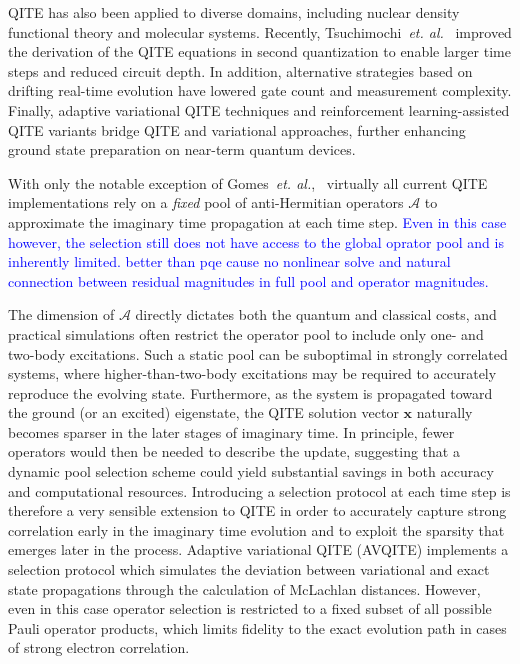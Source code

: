 \documentclass[aip,jcp,amsmath,amssymb, reprint]{revtex4-1}
\newcommand{\note}[2]{%
  \ifthenelse{\boolean{shownotes}}%
    {\textcolor{#1}{#2}}%
    {}%
}
\begin{document}
QITE has also been applied to diverse domains, including nuclear density functional theory\cite{li2024quantum} and molecular systems. Recently, Tsuchimochi~\textit{et. al.}~\cite{Tsuchimochi2023Improved} improved the derivation of the QITE equations in second quantization to enable larger time steps and reduced circuit depth.
In addition, alternative strategies based on drifting real-time evolution have lowered gate count and measurement complexity.\cite{huang2023efficient} 
Finally, adaptive variational QITE techniques and reinforcement learning-assisted QITE variants bridge QITE and variational approaches, further enhancing ground state preparation on near-term quantum devices.\cite{gomes2021adaptive,cao2022quantum}

With only the notable exception of Gomes~\textit{et. al.},~\cite{gomes2021adaptive} virtually all current QITE implementations rely on a \textit{fixed} pool of anti-Hermitian operators $\mathcal{A}$ to approximate the imaginary time propagation at each time step.
\note{blue}{Even in this case however, the selection still does not have access to the global oprator pool and is inherently limited. better than pqe cause no nonlinear solve and natural connection between residual magnitudes in full pool and operator magnitudes.}
The dimension of $\mathcal{A}$ directly dictates both the quantum and classical costs, and practical simulations often restrict the operator pool to include only one- and two-body excitations. 
Such a static pool can be suboptimal in strongly correlated systems, where higher-than-two-body excitations may be required to accurately reproduce the evolving state. 
Furthermore, as the system is propagated toward the ground (or an excited) eigenstate, the QITE solution vector $\mathbf{x}$ naturally becomes sparser in the later stages of imaginary time. 
In principle, fewer operators would then be needed to describe the update, suggesting that a dynamic pool selection scheme could yield substantial savings in both accuracy and computational resources. 
Introducing a selection protocol at each time step is therefore a very sensible extension to QITE in order to accurately capture strong correlation early in the imaginary time evolution and to exploit the sparsity that emerges later in the process. Adaptive variational QITE (AVQITE)\cite{gomes2021adaptive} implements a selection protocol which simulates the deviation between variational and exact state propagations through the calculation of McLachlan distances. However, even in this case operator selection is restricted to a fixed subset of all possible Pauli operator products, which limits fidelity to the exact evolution path in cases of strong electron correlation. 
\end{document}
